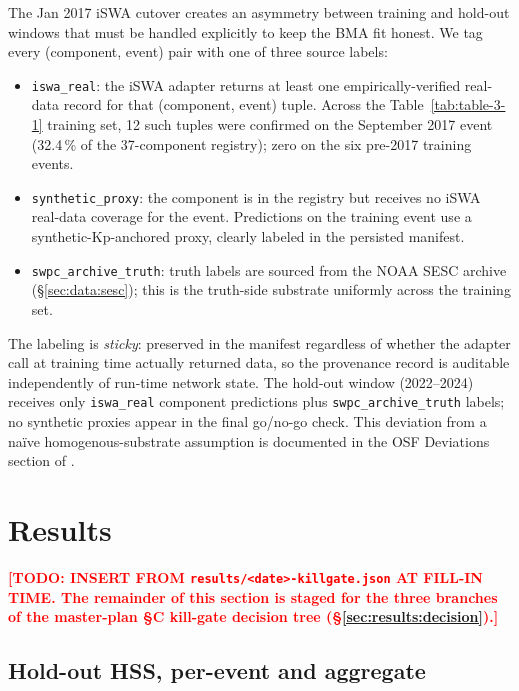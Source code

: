\documentclass[11pt,letterpaper]{article}
\newcommand{\todo}[1]{\textcolor{red}{\textbf{[TODO: #1]}}}
\begin{document}
The Jan 2017 iSWA cutover creates an asymmetry between training and hold-out
windows that must be handled explicitly to keep the BMA fit honest.  We tag
every (component, event) pair with one of three source labels:
\begin{itemize}[leftmargin=*,itemsep=0pt]
  \item \texttt{iswa\_real}: the iSWA adapter returns at least one
        empirically-verified real-data record for that (component, event)
        tuple.  Across the Table~\ref{tab:table-3-1} training set, 12 such
        tuples were confirmed on the September 2017 event (32.4\,\% of the
        37-component registry); zero on the six pre-2017 training events.
  \item \texttt{synthetic\_proxy}: the component is in the registry but
        receives no iSWA real-data coverage for the event.  Predictions on
        the training event use a synthetic-Kp-anchored proxy, clearly
        labeled in the persisted manifest.
  \item \texttt{swpc\_archive\_truth}: truth labels are sourced from the
        NOAA SESC archive (§\ref{sec:data:sesc}); this is the truth-side
        substrate uniformly across the training set.
\end{itemize}
The labeling is \emph{sticky}: preserved in the manifest regardless of
whether the adapter call at training time actually returned data, so the
provenance record is auditable independently of run-time network state.
The hold-out window (2022--2024) receives only \texttt{iswa\_real}
component predictions plus \texttt{swpc\_archive\_truth} labels;
no synthetic proxies appear in the final go/no-go check.  This deviation
from a naïve homogenous-substrate assumption is documented in the OSF
Deviations section of \cite{osf_prereg}.

\section{Results}
\label{sec:results}

\todo{INSERT FROM \texttt{results/<date>-killgate.json} AT FILL-IN TIME.
The remainder of this section is staged for the three branches of the
master-plan §C kill-gate decision tree (§\ref{sec:results:decision}).}

\subsection{Hold-out HSS, per-event and aggregate}
\label{sec:results:hss}
\end{document}
